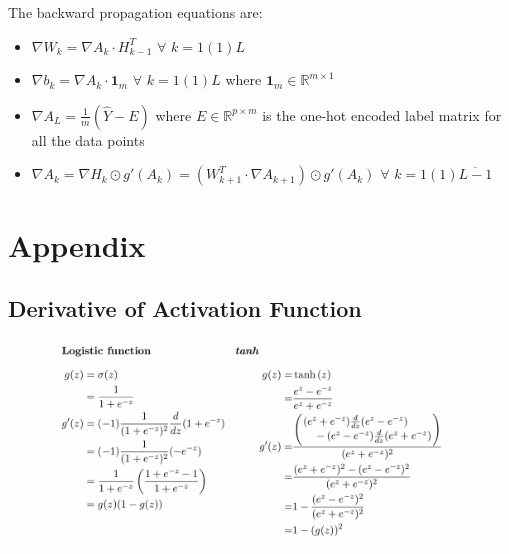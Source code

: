 \documentclass[11pt, a4paper]{article}
\begin{document}
\noindent The backward propagation equations are:

\begin{itemize}

\item $\nabla W_k = \nabla A_k \cdot H_{k-1}^T $ $\forall$ $k = 1(1) L$

\item $\nabla b_k = \nabla A_k \cdot \mathbf{1}_m$ $\forall$ $k = 1(1) L$ where \( \mathbf{1}_m \in \mathbb{R}^{m \times 1} \) 

\item $\nabla A_L = \frac{1}{m} \left( \hat{Y} - E \right)$ where $E \in \mathbb{R}^{p \times m}$ is the one-hot encoded label matrix for all the data points

\item $\nabla A_k = \nabla H_k \odot g'(A_k) = \left(W_{k+1}^T \cdot \nabla A_{k+1}\right) \odot g'(A_k)$ $\forall$ $k = 1(1)\overline{L-1}$

\end{itemize}




\section{Appendix}

\subsection{Derivative of Activation Function}

\begin{figure}[!htbp]
\centering
\includegraphics[scale=0.5]{image_14}
\end{figure}
\end{document}

